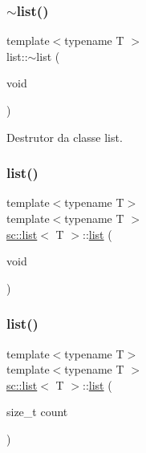 \subsubsection{\texorpdfstring{$\sim$list()}{~list()}}
{\footnotesize\ttfamily template$<$typename T $>$ \\
list\+::$\sim$list (\begin{DoxyParamCaption}\item[{void}]{ }\end{DoxyParamCaption})}

Destrutor da classe list. \mbox{\label{classsc_1_1list_a242ae734432dc0e8a59dc727ed61d1e6}} 
\subsubsection{\texorpdfstring{list()}{list()}\hspace{0.1cm}{\footnotesize\ttfamily [6/10]}}
{\footnotesize\ttfamily template$<$typename T$>$ \\
template$<$typename T $>$ \\
\mbox{\hyperlink{classsc_1_1list}{sc\+::list}}$<$ T $>$\+::\mbox{\hyperlink{classsc_1_1list}{list}} (\begin{DoxyParamCaption}\item[{void}]{ }\end{DoxyParamCaption})}

\mbox{\label{classsc_1_1list_a679021f4ab00ef04f89ed5567a917f70}} 
\subsubsection{\texorpdfstring{list()}{list()}\hspace{0.1cm}{\footnotesize\ttfamily [7/10]}}
{\footnotesize\ttfamily template$<$typename T$>$ \\
template$<$typename T $>$ \\
\mbox{\hyperlink{classsc_1_1list}{sc\+::list}}$<$ T $>$\+::\mbox{\hyperlink{classsc_1_1list}{list}} (\begin{DoxyParamCaption}\item[{size\+\_\+t}]{count }\end{DoxyParamCaption})}

\mbox{\label{classsc_1_1list_a142545a98bc5fec38606bf7000620864}} 
